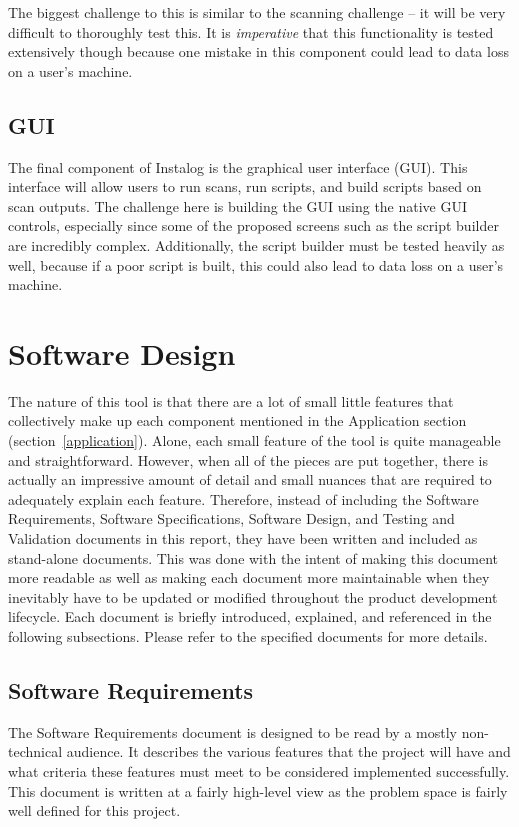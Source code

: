 \documentclass[letterpaper,12pt]{article}
\begin{document}
The biggest challenge to this is similar to the scanning challenge -- it will be
very difficult to thoroughly test this.  It is \textit{imperative} that this
functionality is tested extensively though because one mistake in this component
could lead to data loss on a user's machine.  

\subsection{GUI}
The final component of Instalog is the graphical user interface (GUI).  This
interface will allow users to run scans, run scripts, and build scripts based on
scan outputs.  The challenge here is building the GUI using the native GUI
controls, especially since some of the proposed screens such as the script
builder are incredibly complex.  Additionally, the script builder must be tested
heavily as well, because if a poor script is built, this could also lead to data
loss on a user's machine.  

\newpage



\section{Software Design} \label{design}
The nature of this tool is that there are a lot of small little features that
collectively make up each component mentioned in the Application section
(section~\ref{application}).  Alone, each small feature of the tool is quite
manageable and straightforward.  However, when all of the pieces are put
together, there is actually an impressive amount of detail and small nuances
that are required to adequately explain each feature.  Therefore, instead of
including the Software Requirements, Software Specifications, Software Design,
and Testing and Validation documents in this report, they have been written and
included as stand-alone documents.  This was done with the intent of making this
document more readable as well as making each document more maintainable when
they inevitably have to be updated or modified throughout the product
development lifecycle.  Each document is briefly introduced, explained, and
referenced in the following subsections.  Please refer to the specified
documents for more details.

\subsection{Software Requirements}
\label{software_requirements}
The Software Requirements document \cite{Requirements} is designed to be read by
a mostly non-technical audience.  It describes the various features that the
project will have and what criteria these features must meet to be considered
implemented successfully.  This document is written at a fairly high-level view
as the problem space is fairly well defined for this project.
\end{document}
